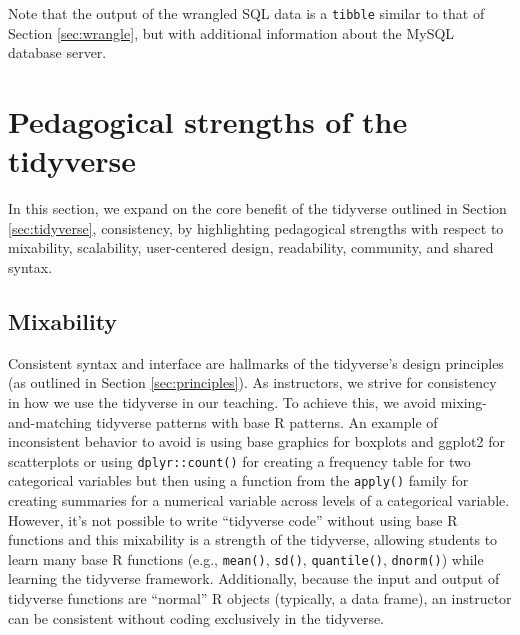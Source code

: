 \documentclass[12pt]{article}
\begin{document}

\label{SQL-ex} \linespread{2} \vspace{3mm}\setlength{\parindent}{15pt}

Note that the output of the wrangled SQL data is a \texttt{tibble}
similar to that of Section \ref{sec:wrangle}, but with additional
information about the MySQL database server.

\hypertarget{sec:teach}{%
\section{Pedagogical strengths of the tidyverse}\label{sec:teach}}

In this section, we expand on the core benefit of the tidyverse outlined
in Section \ref{sec:tidyverse}, consistency, by highlighting pedagogical
strengths with respect to mixability, scalability, user-centered design,
readability, community, and shared syntax.

\hypertarget{sec:mixability}{%
\subsection{Mixability}\label{sec:mixability}}

Consistent syntax and interface are hallmarks of the tidyverse's design
principles (as outlined in Section \ref{sec:principles}). As
instructors, we strive for consistency in how we use the tidyverse in
our teaching. To achieve this, we avoid mixing-and-matching tidyverse
patterns with base R patterns. An example of inconsistent behavior to
avoid is using base graphics for boxplots and ggplot2 for scatterplots
or using \texttt{dplyr::count()} for creating a frequency table for two
categorical variables but then using a function from the
\texttt{apply()} family for creating summaries for a numerical variable
across levels of a categorical variable. However, it's not possible to
write ``tidyverse code'' without using base R functions and this
mixability is a strength of the tidyverse, allowing students to learn
many base R functions (e.g., \texttt{mean()}, \texttt{sd()},
\texttt{quantile()}, \texttt{dnorm()}) while learning the tidyverse
framework. Additionally, because the input and output of tidyverse
functions are ``normal'' R objects (typically, a data frame), an
instructor can be consistent without coding exclusively in the
tidyverse.
\end{document}
